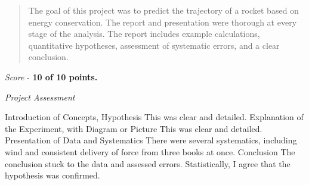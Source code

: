 \documentclass[10pt]{article}
\begin{document}
\maketitle

\begin{abstract}
The goal of this project was to predict the trajectory of a rocket based on energy conservation.  The report and presentation were thorough at every stage of the analysis.  The report includes example calculations, quantitative hypotheses, assessment of systematic errors, and a clear conclusion.
\end{abstract}

\textit{Score} - \textbf{10 of 10 points.}

\textit{Project Assessment}
\begin{outline}[enumerate]
\1 Introduction of Concepts, Hypothesis
\2 This was clear and detailed.
\1 Explanation of the Experiment, with Diagram or Picture
\2 This was clear and detailed.
\1 Presentation of Data and Systematics
\2 There were several systematics, including wind and consistent delivery of force from three books at once.
\1 Conclusion
\2 The conclusion stuck to the data and assessed errors.  Statistically, I agree that the hypothesis was confirmed.
\end{outline}
\end{document}
